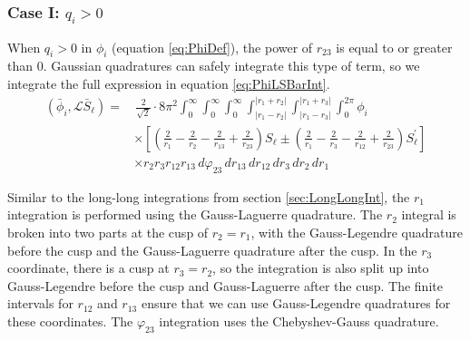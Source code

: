\documentclass[Dissertation.tex]{subfiles}
\begin{document}
\subsubsection{Case I: \texorpdfstring{$q_i > 0$}{qi > 0}}
\label{sec:Swaveqigt0}
When $q_i > 0$ in $\phi_i$ (equation \ref{eq:PhiDef}), the power of $r_{23}$ is equal to or greater than 0.  Gaussian quadratures can safely integrate this type of term, so we integrate the full expression in equation \ref{eq:PhiLSBarInt}.
\begin{align}
\label{eq:PhiLSBarIntFull}
\nonumber (\bar{\phi}_i, \mathcal{L} \bar{S}_\ell) =& \, \frac{2}{\sqrt{2}} \cdot 8\pi^2  \int_0^\infty \int_0^\infty \int_0^\infty \int_{|r_1 - r_2|}^{|r_1 + r_2|} \int_{|r_1 - r_3|}^{|r_1 + r_3|} \int_0^{2\pi} \phi_i \\
&\times \left[ \left( \frac{2}{r_1} - \frac{2}{r_2} - \frac{2}{r_{13}} + \frac{2}{r_{23}} \right)S_\ell \pm \left( \frac{2}{r_1} - \frac{2}{r_3} - \frac{2}{r_{12}} + \frac{2}{r_{23}} \right) S_\ell^\prime \right] \\
&\times r_2 r_3 r_{12} r_{13}\, d\varphi_{23}\, dr_{13}\, dr_{12}\, dr_3\, dr_2\, dr_1
\end{align}

Similar to the long-long integrations from section \ref{sec:LongLongInt}, the 
$r_1$ integration is performed using the Gauss-Laguerre quadrature. The $r_2$
integral is broken into two parts at the cusp of $r_2 = r_1$, with the
Gauss-Legendre quadrature before the cusp and the Gauss-Laguerre quadrature 
after the cusp. In the $r_3$ coordinate, there is a cusp at $r_3 = r_2$, so 
the integration is also split up into Gauss-Legendre before the cusp and
Gauss-Laguerre after the cusp. The finite intervals for $r_{12}$ and $r_{13}$ 
ensure that we can use Gauss-Legendre quadratures for these coordinates. The 
$\varphi_{23}$ integration uses the Chebyshev-Gauss quadrature.
\end{document}
